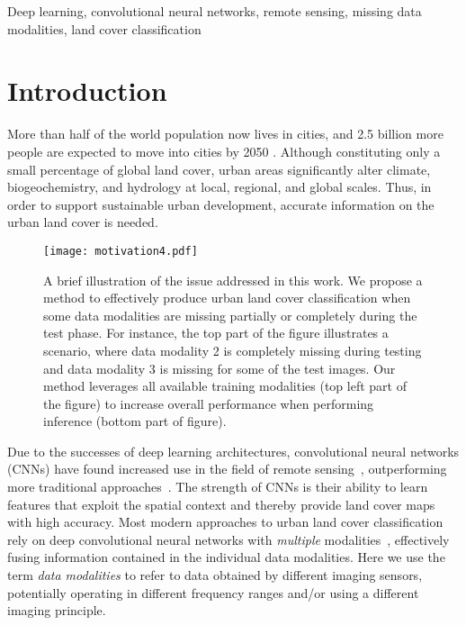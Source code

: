 \documentclass[journal]{IEEEtran}
\begin{document}
\begin{IEEEkeywords}
Deep learning, convolutional neural networks, remote sensing, missing data modalities, land cover classification
\end{IEEEkeywords}

\IEEEpeerreviewmaketitle

\section{Introduction}
\label{sec:intro}
More than half of the world population now lives in cities, and 2.5 billion more people are expected to move into cities by 2050 \cite{un2015world}.
Although constituting only a small percentage of global land cover, urban areas significantly alter climate, biogeochemistry, and hydrology at local, regional, and global scales. Thus, in order to support sustainable urban development, accurate information on the urban land cover is needed.

\begin{figure}[htb]
\centering
\texttt{[image: motivation4.pdf]}
\caption{A brief illustration of the issue addressed in this work. We propose a method to effectively produce urban land cover classification when some data modalities are missing partially or completely during the test phase. For instance, the top part of the figure illustrates a scenario, where data modality 2 is completely missing during testing and data modality 3 is missing for some of the test images. Our method leverages all available training modalities (top left part of the figure) to increase overall performance when performing inference (bottom part of figure).}
\label{fig:motivation}
\end{figure}

Due to the successes of deep learning architectures, convolutional neural networks (CNNs) have found increased use in the field of remote sensing~\cite{kampffmeyer2016semantic, maggiori2016fully, krylov2016large, volpi2017dense, audebert2017fusion}, outperforming more traditional approaches~\cite{lagrange2015benchmarking}.
The strength of CNNs is their ability to learn features that exploit the spatial context and thereby provide land cover maps with high accuracy. Most modern approaches to urban land cover classification rely on deep convolutional neural networks with \emph{multiple} modalities~\cite{kampffmeyer2016semantic, maggiori2016fully, krylov2016large, volpi2017dense, audebert2017fusion}, effectively fusing information contained in the individual data modalities. Here we use the term \emph{data modalities} to refer to data obtained by different imaging sensors, potentially operating in different frequency ranges and/or using a different imaging principle.
\end{document}
